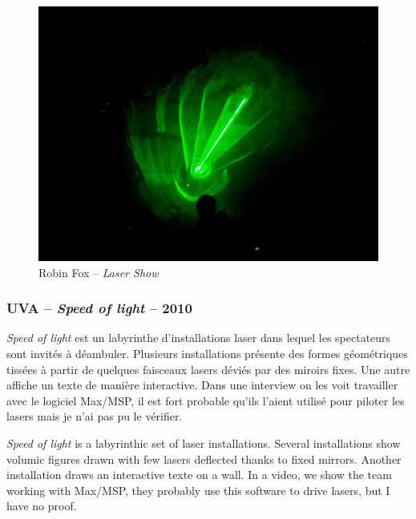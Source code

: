 \begin{figure}[ht]
\begin{center}
\includegraphics[width=\textwidth]{images/robin_fox.jpg} 
\end{center}
\caption{Robin Fox -- \textit{Laser Show}}
\label{fig:fox}
\end{figure}

\subsubsection{UVA -- \textit{Speed of light} -- 2010}
\begin{fr}
\textit{Speed of light} est un labyrinthe d'installations laser dans lequel les spectateurs sont invités à déambuler. 
Plusieurs installations présente des formes géométriques tissées à partir de quelques faisceaux lasers déviés par des miroirs fixes. 
Une autre affiche un texte de manière interactive.
Dans une interview on les voit travailler avec le logiciel Max/MSP, il est fort probable qu'ils l'aient utilisé pour piloter les lasers mais je n'ai pas pu le vérifier.
\end{fr}

\begin{en}
\textit{Speed of light} is a labyrinthic set of laser installations.
Several installations show volumic figures drawn with few lasers deflected thanks to fixed mirrors.
Another installation draws an interactive texte on a wall.
In a video, we show the team working with Max/MSP, they probably use this software to drive lasers, but I have no proof.
\end{en}

